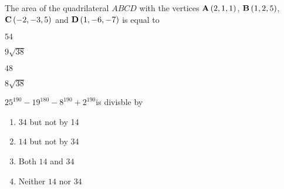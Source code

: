 	\item 
	The area of the quadrilateral $ABCD$ with the vertices $\mathbf{A}\left(2, 1, 1\right)$, $\mathbf{B}\left(1, 2, 5\right)$, $\mathbf{C}\left(-2, -3, 5\right)$ and $\mathbf{D}\left(1, -6, -7\right)$ is equal to 
	\hfill{}
	\begin{enumerate}    
        \begin{multicols}{4}
                \item $54$
                \item $9\sqrt{38}$
                \item $48$
                \item $8\sqrt{38}$
                \end{multicols}
       \end{enumerate}
       
       
    \item $25^{190}-19^{180}-8^{190}+2^{190}$is divisble by
        \hfill{}
        \begin{multicols}{4}
            \begin{enumerate}
                \item $34$ but not by 14
                \item $14$ but not by 34
                \item Both $14$ and $34$
                \item Neither $14$ nor $34$
            \end{enumerate}
        \end{multicols}
        
